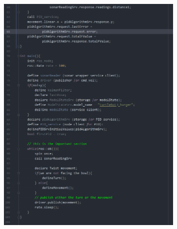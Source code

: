 \documentclass{article}
\begin{document}
\begin{figure}[ht]
\begin{subfigure}{.5\textwidth}
    \end{subfigure}
    \begin{subfigure}{.5\textwidth}
        \centering
        \includegraphics[scale=0.33]{img/pseudocode_2.png}
    \end{subfigure}
\end{figure}
\newpage
\end{document}

